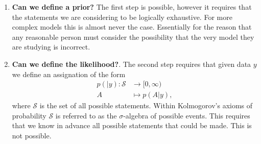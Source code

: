 \documentclass[
    a4paper,
    DIV=14,
    abstract=true,
    numbers=noenddot
]
{scrartcl}
\theoremstyle{definition}
\newcommand{\Ss}{\mathcal{S}}
\begin{document}
\begin{enumerate}
    \item \textbf{Can we define a prior?}  The first step is possible, however it requires that the statements we are considering to be logically exhaustive. For more complex models this is almost never the case. Essentially for the reason that any reasonable person must consider the possibility that the very model they are studying is incorrect.
    \item  \textbf{Can we define the likelihood?}.  The second step requires that given data $y$ we define  an assignation of the form
          \begin{align*}
              p(|y): \Ss & \longrightarrow  [0,\infty) \\
              A          & \longmapsto p(A|y),\end{align*}
          where $\Ss $ is the set of all possible statements. Within Kolmogorov's axioms of probability $\Ss $ is referred to as the $\sigma $-algebra of possible events. This requires that we know in advance all possible statements that could be made. This is not possible.

\end{enumerate}
\end{document}
